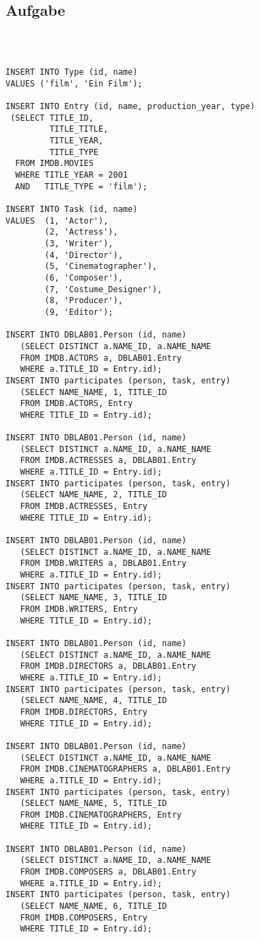 \documentclass[11pt,a4paper,DIV=9]{scrartcl}
\newcounter{temp}
\newcommand{\aufgabe}[1]{
  \setcounter{temp}{\value{subsection}}
  \setcounter{subsection}{#1}
  \addtocounter{subsection}{-1}
  \subsection{Aufgabe}
  \setcounter{subsection}{\value{temp}}
}
\begin{document}
\aufgabe{4}
\begin{lstlisting}



INSERT INTO Type (id, name)
VALUES ('film', 'Ein Film');

INSERT INTO Entry (id, name, production_year, type)
 (SELECT TITLE_ID,
         TITLE_TITLE,
         TITLE_YEAR,
         TITLE_TYPE
  FROM IMDB.MOVIES
  WHERE TITLE_YEAR = 2001
  AND   TITLE_TYPE = 'film');

INSERT INTO Task (id, name)
VALUES  (1, 'Actor'),
        (2, 'Actress'),
        (3, 'Writer'),
        (4, 'Director'),
        (5, 'Cinematographer'),
        (6, 'Composer'),
        (7, 'Costume_Designer'),
        (8, 'Producer'),
        (9, 'Editor');

INSERT INTO DBLAB01.Person (id, name)
   (SELECT DISTINCT a.NAME_ID, a.NAME_NAME
   FROM IMDB.ACTORS a, DBLAB01.Entry
   WHERE a.TITLE_ID = Entry.id);
INSERT INTO participates (person, task, entry)
   (SELECT NAME_NAME, 1, TITLE_ID
   FROM IMDB.ACTORS, Entry
   WHERE TITLE_ID = Entry.id);

INSERT INTO DBLAB01.Person (id, name)
   (SELECT DISTINCT a.NAME_ID, a.NAME_NAME
   FROM IMDB.ACTRESSES a, DBLAB01.Entry
   WHERE a.TITLE_ID = Entry.id);
INSERT INTO participates (person, task, entry)
   (SELECT NAME_NAME, 2, TITLE_ID
   FROM IMDB.ACTRESSES, Entry
   WHERE TITLE_ID = Entry.id);

INSERT INTO DBLAB01.Person (id, name)
   (SELECT DISTINCT a.NAME_ID, a.NAME_NAME
   FROM IMDB.WRITERS a, DBLAB01.Entry
   WHERE a.TITLE_ID = Entry.id);
INSERT INTO participates (person, task, entry)
   (SELECT NAME_NAME, 3, TITLE_ID
   FROM IMDB.WRITERS, Entry
   WHERE TITLE_ID = Entry.id);

INSERT INTO DBLAB01.Person (id, name)
   (SELECT DISTINCT a.NAME_ID, a.NAME_NAME
   FROM IMDB.DIRECTORS a, DBLAB01.Entry
   WHERE a.TITLE_ID = Entry.id);
INSERT INTO participates (person, task, entry)
   (SELECT NAME_NAME, 4, TITLE_ID
   FROM IMDB.DIRECTORS, Entry
   WHERE TITLE_ID = Entry.id);

INSERT INTO DBLAB01.Person (id, name)
   (SELECT DISTINCT a.NAME_ID, a.NAME_NAME
   FROM IMDB.CINEMATOGRAPHERS a, DBLAB01.Entry
   WHERE a.TITLE_ID = Entry.id);
INSERT INTO participates (person, task, entry)
   (SELECT NAME_NAME, 5, TITLE_ID
   FROM IMDB.CINEMATOGRAPHERS, Entry
   WHERE TITLE_ID = Entry.id);

INSERT INTO DBLAB01.Person (id, name)
   (SELECT DISTINCT a.NAME_ID, a.NAME_NAME
   FROM IMDB.COMPOSERS a, DBLAB01.Entry
   WHERE a.TITLE_ID = Entry.id);
INSERT INTO participates (person, task, entry) 
   (SELECT NAME_NAME, 6, TITLE_ID
   FROM IMDB.COMPOSERS, Entry
   WHERE TITLE_ID = Entry.id);


\end{lstlisting}
\end{document}
